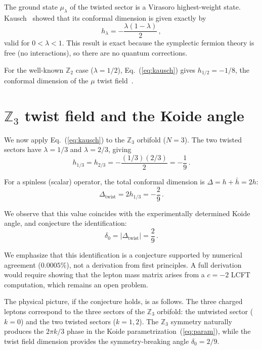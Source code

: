 \documentclass[aps,prl,twocolumn,superscriptaddress]{revtex4-2}
\begin{document}
The ground state $\mu_\lambda$ of the twisted sector is a Virasoro highest-weight state.
Kausch~\cite{Kausch2000} showed that its conformal dimension is given exactly by
\begin{equation}
h_\lambda = -\frac{\lambda(1-\lambda)}{2}\,,
\label{eq:kausch}
\end{equation}
valid for $0 < \lambda < 1$. This result is exact because the symplectic fermion theory
is free (no interactions), so there are no quantum corrections.

For the well-known $\mathbb{Z}_2$ case ($\lambda = 1/2$), Eq.~(\ref{eq:kausch}) gives
$h_{1/2} = -1/8$, the conformal dimension of the $\mu$ twist
field~\cite{Kausch1995,Gaberdiel1996}.

\section{$\mathbb{Z}_3$ twist field and the Koide angle}

We now apply Eq.~(\ref{eq:kausch}) to the $\mathbb{Z}_3$ orbifold ($N = 3$). The two
twisted sectors have $\lambda = 1/3$ and $\lambda = 2/3$, giving
\begin{equation}
h_{1/3} = h_{2/3} = -\frac{(1/3)(2/3)}{2} = -\frac{1}{9}\,.
\label{eq:h19}
\end{equation}

For a spinless (scalar) operator, the total conformal dimension is $\Delta = h + \bar{h} = 2h$:
\begin{equation}
\Delta_{\text{twist}} = 2h_{1/3} = -\frac{2}{9}\,.
\label{eq:delta}
\end{equation}

We observe that this value coincides with the experimentally determined Koide angle, and
conjecture the identification:
\begin{equation}
\delta_0 = |\Delta_{\text{twist}}| = \frac{2}{9}\,.
\label{eq:identification}
\end{equation}

We emphasize that this identification is a conjecture supported by numerical agreement
($0.0005\%$), not a derivation from first principles. A full derivation would require
showing that the lepton mass matrix arises from a $c = -2$ LCFT computation, which
remains an open problem.

The physical picture, if the conjecture holds, is as follows. The three charged leptons
correspond to the three sectors of the $\mathbb{Z}_3$ orbifold: the untwisted sector
($k=0$) and the two twisted sectors ($k=1,2$). The $\mathbb{Z}_3$ symmetry naturally
produces the $2\pi k/3$ phase in the Koide parametrization~(\ref{eq:param}), while the
twist field dimension provides the symmetry-breaking angle $\delta_0 = 2/9$.
\end{document}
